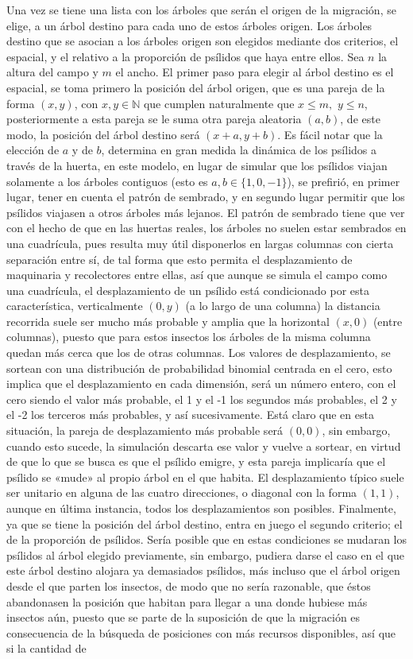 Una vez se tiene una lista con los árboles que serán el origen de la migración, se elige, a un árbol destino para cada uno de estos árboles origen. Los árboles destino que se asocian a los árboles origen son elegidos mediante dos criterios, el espacial, y el relativo a la proporción de psílidos que haya entre ellos. Sea $n$ la altura del campo y $m$ el ancho. El primer paso para elegir al árbol destino es el espacial, se toma primero la posición del árbol origen, que es una pareja de la forma $(x, y)$, con $x, y \in \mathbb{N}$ que cumplen naturalmente que $x\leq m,$ $ y \leq n$, posteriormente a esta pareja se le suma otra pareja aleatoria $(a, b)$, de este modo, la posición del árbol destino será $(x+a, y+b)$. Es fácil notar que la elección de $a$ y de $b$, determina en gran medida la dinámica de los psílidos a través de la huerta, en este modelo, en lugar de simular que los psílidos viajan solamente a los árboles contiguos (esto es $a, b \in \{1, 0, -1\}$), se prefirió, en primer lugar, tener en cuenta el patrón de sembrado, y en segundo lugar permitir que los psílidos viajasen a otros árboles más lejanos. El patrón de sembrado tiene que ver con el hecho de que en las huertas reales, los árboles no suelen estar sembrados en una cuadrícula, pues resulta muy útil disponerlos en largas columnas con cierta separación entre sí, de tal forma que esto permita el desplazamiento de maquinaria y recolectores entre ellas, así que aunque se simula el campo como una cuadrícula, el desplazamiento de un psílido está condicionado por esta característica, verticalmente $(0, y)$ (a lo largo de una columna) la distancia recorrida suele ser mucho más probable y amplia que la horizontal $(x, 0)$ (entre columnas), puesto que para estos insectos los árboles de la misma columna quedan más cerca que los de otras columnas. Los valores de desplazamiento, se sortean con una distribución de probabilidad binomial centrada en el cero, esto implica que el desplazamiento en cada dimensión, será un número entero, con el cero siendo el valor más probable, el 1 y el -1 los segundos más probables, el 2 y el -2 los terceros más probables, y así sucesivamente. Está claro que en esta situación, la pareja de desplazamiento más probable será $(0, 0)$, sin embargo, cuando esto sucede, la simulación descarta ese valor y vuelve a sortear, en virtud de que lo que se busca es que el psílido emigre, y esta pareja implicaría que el psílido se «mude» al propio árbol en el que habita. El desplazamiento típico suele ser unitario en alguna de las cuatro direcciones, o diagonal con la forma $(1, 1)$, aunque en última instancia, todos los desplazamientos son posibles. Finalmente, ya que se tiene la posición del árbol destino, entra en juego el segundo criterio; el de la proporción de psílidos. Sería posible que en estas condiciones se mudaran los psílidos al árbol elegido previamente, sin embargo, pudiera darse el caso en el que este árbol destino alojara ya demasiados psílidos, más incluso que el árbol origen desde el que parten los insectos, de modo que no sería razonable, que éstos abandonasen la posición que habitan para llegar a una donde hubiese más insectos aún, puesto que se parte de la suposición de que la migración es consecuencia de la búsqueda de posiciones con más recursos disponibles, así que si la cantidad de 